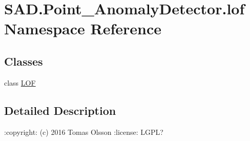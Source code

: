 \hypertarget{namespaceSAD_1_1Point__AnomalyDetector_1_1lof}{}\section{S\+A\+D.\+Point\+\_\+\+Anomaly\+Detector.\+lof Namespace Reference}
\label{namespaceSAD_1_1Point__AnomalyDetector_1_1lof}
\subsection*{Classes}
\begin{DoxyCompactItemize}
\item 
class \hyperlink{classSAD_1_1Point__AnomalyDetector_1_1lof_1_1LOF}{L\+OF}
\end{DoxyCompactItemize}


\subsection{Detailed Description}
\begin{DoxyVerb}:copyright: (c) 2016 Tomas Olsson
:license: LGPL?
\end{DoxyVerb}
 